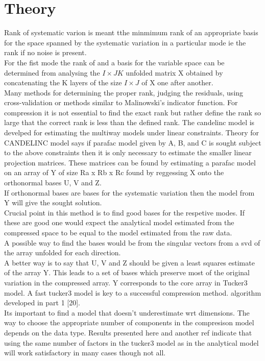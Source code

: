 \documentclass[10pt, draft]{article}
\begin{document}
\section{Theory}

Rank of systematic varion is meant tthe minmimum rank of an appropriate basis for the space spanned by the systematic variation in a particular mode ie the rank if no noise is present.  \\
For the fist mode the rank of and a basis for the variable space can be determined from analysing the $ I \times JK$ unfolded matrix X obtained by concatenating the K layers of the size $I \times J$ of X one after another.\\
Many methods for determining the proper rank, judging the residuals, using cross-validation or methods similar to Malinowski's indicator function.  For compression it is not essential to find the exact rank but rather define the rank so large that the correct rank is less than the defined rank. The candelinc model is develped for estimating the multiway models under linear constraints.  Theory for CANDELINC model says if parafac model given by A, B, and C is sought subject to the above constraints then it is only necessary to estimate the smaller linear projection matrices.  These matrices can be found by estimating a parafac model on an array of Y of size Ra x Rb x Rc found by reggessing X onto the orthonormal bases U, V and Z.  \\
If orthonormal bases are bases for the systematic variation then the model from Y will give the sought solution.  \\
Crucial point in this method is to find good bases for the respetive modes.  If these are good one would expect the analytical model estimated from the compressed space to be equal to the model estimated from the raw data.\\
A possible way to find the bases would be from the singular vectors from a svd of the array unfolded for each direction.  \\
A better way is to say that U, V and Z should be given a least squares estimate of the array Y.  This leads to a set of bases which preserve most of the original variation in the compressed array.  Y corresponds to the core array in Tucker3 model.  A fast tucker3 model is key to a successful compression method.  algorithm developed in part 1 [20].  \\
Its important to find a model that doesn't underestimate wrt dimensions.  The way to choose the appropriate number of components in the compresison model depends on the data type. Results presented here and another ref indicate that using the same number of factors in the tucker3 model as in the analytical model will work satisfactory in many cases though not all.
\end{document}
